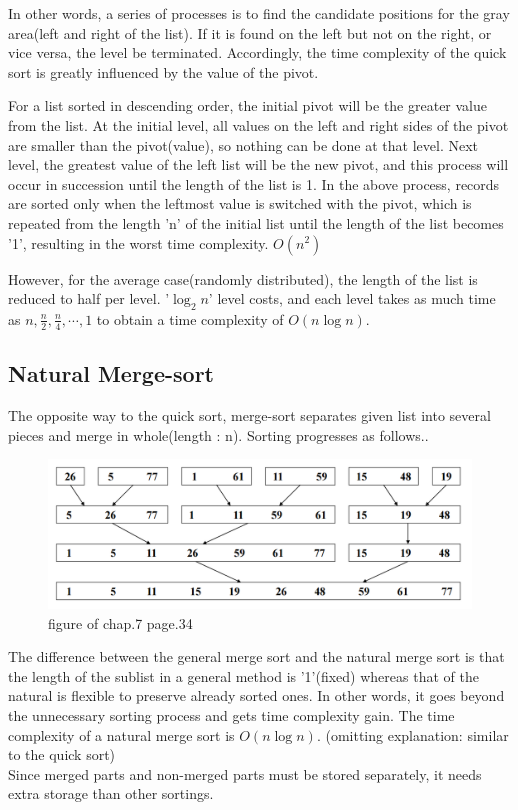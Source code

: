 \documentclass{article}
\begin{document}
In other words, a series of processes is to find the candidate positions for the gray area(left and right of the list). If it is found on the left but not on the right, or vice versa, the level be terminated. Accordingly, the time complexity of the quick sort is greatly influenced by the value of the pivot. \pagebreak

For a list sorted in descending order, the initial pivot will be the greater value from the list. At the initial level, all values on the left and right sides of the pivot are smaller than the pivot(value), so nothing can be done at that level. Next level, the greatest value of the left list will be the new pivot, and this process will occur in succession until the length of the list is 1. 
In the above process, records are sorted only when the leftmost value is switched with the pivot, which is repeated from the length 'n' of the initial list until the length of the list becomes '1', resulting in the worst time complexity. $O(n^2)$

However, for the average case(randomly distributed), the length of the list is reduced to half per level. '$\log_2 n$' level costs, and each level takes as much time as $n, \frac{n}{2}, \frac{n}{4}, \cdots, 1$ to obtain a time complexity of $O(n \log n)$.

\subsection{Natural Merge-sort }
The opposite way to the quick sort, merge-sort separates given list into several pieces and merge in whole(length : n).
Sorting progresses as follows..\\
\begin{figure}[h]\centering
\includegraphics[width=.9\linewidth]{nmerge.PNG}
\caption*{figure of chap.7 page.34}
\end{figure}
The difference between the general merge sort and the natural merge sort is that the length of the sublist in a general method is '1'(fixed) whereas that of the natural is flexible to preserve already sorted ones. In other words, it goes beyond the unnecessary sorting process and gets time complexity gain.
The time complexity of a natural merge sort is $O(n\log n)$. (omitting explanation: similar to the quick sort)\\
Since merged parts and non-merged parts must be stored separately, it needs extra storage than other sortings.
\pagebreak
\end{document}
